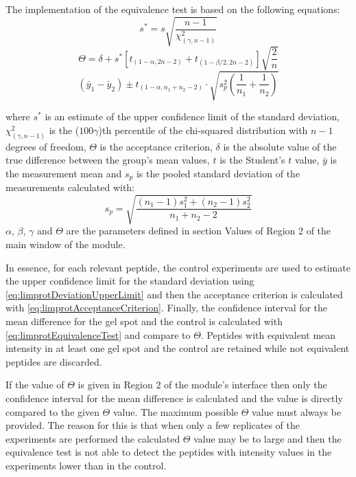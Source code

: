 The implementation of the equivalence test is based on the following equations:
\begin{equation}
    \label{eq:limprotDeviationUpperLimit}
    s^* = s\sqrt{\frac{n-1}{\chi^2_{(\gamma, n-1)}}}
\end{equation}
\begin{equation}
\label{eq:limprotAcceptanceCriterion}
\Theta = \delta + s^*\left[t_{(1-\alpha, 2n-2)} + t_{(1-\beta/2, 2n-2)}\right]\sqrt{\frac{2}{n}}
\end{equation}
\begin{equation}
\label{eq:limprotEquivalenceTest}
(\bar{y}_1 - \bar{y}_2) \pm t_{(1-\alpha, n_1+n_2-2)} \cdot \sqrt{s^2_p\left(\frac{1}{n_1}+\frac{1}{n_2}\right)}
\end{equation}

where $s^*$ is an estimate of the upper confidence limit of the standard deviation, $\chi^2_{(\gamma, n-1)}$ is the ($100\gamma$)th percentile of the chi-squared distribution with $n-1$ degrees of freedom, $\Theta$ is the acceptance criterion, $\delta$ is the absolute value of the true difference between the group's mean values, $t$ is the Student's $t$ value, $\bar{y}$ is the measurement mean and $s_p$ is the pooled standard deviation of the measurements calculated with:
\begin{equation}
\label{eq:poolStDev}
s_p =  \sqrt{\frac{(n_1-1)s^2_1+(n_2-1)s^2_2}{n_1+n_2-2}}
\end{equation}
$\alpha$, $\beta$, $\gamma$ and $\Theta$ are the parameters defined in section Values of Region \num{2} of the main window of the module.

In essence, for each relevant peptide, the control experiments are used to estimate the upper confidence limit for the standard deviation using \autoref{eq:limprotDeviationUpperLimit} and then the acceptance criterion is calculated with \autoref{eq:limprotAcceptanceCriterion}. Finally, the confidence interval for the mean difference for the gel spot and the control is calculated with \autoref{eq:limprotEquivalenceTest} and compare to $\Theta$. Peptides with equivalent mean intensity in at least one gel spot and the control are retained while not equivalent peptides are discarded. 

If the value of $\Theta$ is given in Region \num{2} of the module's interface then only the confidence interval for the mean difference is calculated and the value is directly compared to the given $\Theta$ value. The maximum possible $\Theta$ value must always be provided. The reason for this is that when only a few replicates of the experiments are performed the calculated $\Theta$ value may be to large and then the equivalence test is not able to detect the peptides with intensity values in the experiments lower than in the control.

